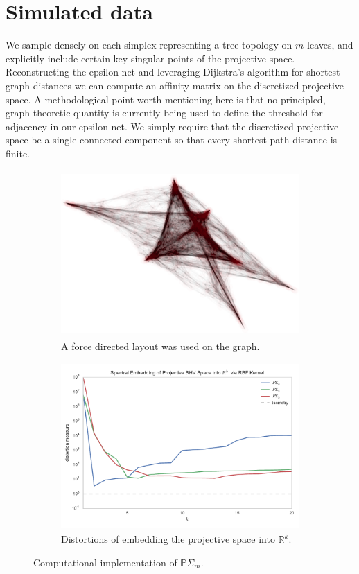 \documentclass[a4paper,11pt]{article}
\begin{document}
\section{Simulated data}\label{sec:simulated}

We sample densely on each simplex representing a tree topology on $m$ leaves, and explicitly include certain key singular points of the projective space.
Reconstructing the epsilon net and leveraging Dijkstra's algorithm for shortest graph distances we can compute an affinity matrix on the discretized projective space.
A methodological point worth mentioning here is that no principled, graph-theoretic quantity is currently being used to define the threshold for adjacency in our epsilon net.
We simply require that the discretized projective space be a single connected component so that every shortest path distance is finite.

\begin{figure}
    \begin{subfigure}{\linewidth}
    \centering
    \includegraphics[height=2.5in]{figures/synthetic_graph_layout.png}
    \caption{A force directed layout was used on the graph.}
    \end{subfigure}
   
    \begin{subfigure}{\linewidth}
    \centering
    \includegraphics[height=2.5in]{figures/synthetic_distortion.pdf}
    \caption{Distortions of embedding the projective space into $\mathbb{R}^k$.}
    \end{subfigure}

    \caption{Computational implementation of $\mathbb{P}\Sigma_m$.}
     \label{fig:discretization}
\end{figure}
\end{document}
